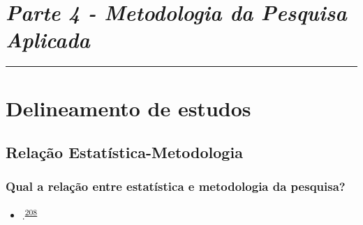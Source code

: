 \documentclass[
  a4paper,
]{book}
\providecommand{\tightlist}{%
  \setlength{\itemsep}{0pt}\setlength{\parskip}{0pt}}
\begin{document}

\hypertarget{parte-4---metodologia-da-pesquisa-aplicada}{%
\chapter*{\texorpdfstring{\emph{Parte 4 - Metodologia da Pesquisa Aplicada}}{Parte 4 - Metodologia da Pesquisa Aplicada}}\label{parte-4---metodologia-da-pesquisa-aplicada}}

\markboth{}{}
\par\noindent\rule{\textwidth}{0.05in}

\hypertarget{delineamento-estudos}{%
\chapter{\texorpdfstring{\textbf{Delineamento de estudos}}{Delineamento de estudos}}\label{delineamento-estudos}}

\hypertarget{relauxe7uxe3o-estatuxedstica-metodologia}{%
\section{Relação Estatística-Metodologia}\label{relauxe7uxe3o-estatuxedstica-metodologia}}

\hypertarget{qual-a-relauxe7uxe3o-entre-estatuxedstica-e-metodologia-da-pesquisa}{%
\subsection{Qual a relação entre estatística e metodologia da pesquisa?}\label{qual-a-relauxe7uxe3o-entre-estatuxedstica-e-metodologia-da-pesquisa}}

\begin{itemize}
\tightlist
\item
  .\textsuperscript{\protect\hyperlink{ref-munafuxf22017}{208}}
\end{itemize}
\end{document}
